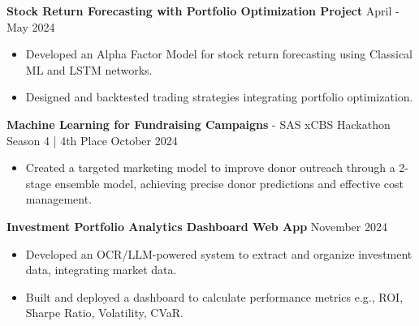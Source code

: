 \documentclass[11pt]{article}
\begin{document}
\vspace{3pt}

\textbf{Stock Return Forecasting with Portfolio Optimization Project} \hfill April - May 2024
\begin{itemize}[noitemsep, topsep=0pt, partopsep=0pt, parsep=0pt]
    \item Developed an Alpha Factor Model for stock return forecasting using Classical ML and LSTM networks.
    \item Designed and backtested trading strategies integrating portfolio optimization.
\end{itemize}

\vspace{3pt}

\textbf{Machine Learning for Fundraising Campaigns} - SAS xCBS Hackathon Season 4 | 4th Place \hfill October 2024
\begin{itemize}[noitemsep, topsep=0pt, partopsep=0pt, parsep=0pt]
    \item Created a targeted marketing model to improve donor outreach through a 2-stage ensemble model, achieving precise donor predictions and effective cost management.
\end{itemize}

\vspace{3pt}

\textbf{Investment Portfolio Analytics Dashboard Web App} \hfill November 2024
\begin{itemize}[noitemsep, topsep=0pt, partopsep=0pt, parsep=0pt]
    \item Developed an OCR/LLM-powered system to extract and organize investment data, integrating market data.
    \item Built and deployed a dashboard to calculate performance metrics e.g., ROI, Sharpe Ratio, Volatility, CVaR.
\end{itemize}

\vspace{3pt}
\end{document}
